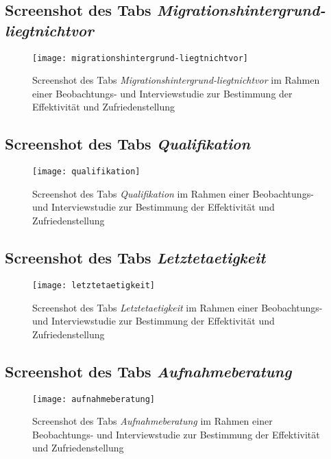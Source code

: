 \begin{landscape}
    \subsection{Screenshot des Tabs \textit{Migrationshintergrund-liegtnichtvor}}
    \label{section-migrationshintergrund-liegtnichtvor}
    \begin{figure}[H]
        \centering
        \caption{Screenshot des Tabs \textit{Migrationshintergrund-liegtnichtvor} im Rahmen einer Beobachtungs- und Interviewstudie zur Bestimmung der Effektivität und Zufriedenstellung}
        \begin{adjustbox}{width=\linewidth, center}
            \texttt{[image: migrationshintergrund-liegtnichtvor]}
        \end{adjustbox}
    \end{figure}

    \subsection{Screenshot des Tabs \textit{Qualifikation}}
    \label{section-qualifikation}
    \begin{figure}[H]
        \centering
        \caption{Screenshot des Tabs \textit{Qualifikation} im Rahmen einer Beobachtungs- und Interviewstudie zur Bestimmung der Effektivität und Zufriedenstellung}
        \begin{adjustbox}{width=\linewidth, center}
            \texttt{[image: qualifikation]}
        \end{adjustbox}
    \end{figure}

    \subsection{Screenshot des Tabs \textit{Letztetaetigkeit}}
    \label{section-letztetaetigkeit}
    \begin{figure}[H]
        \centering
        \caption{Screenshot des Tabs \textit{Letztetaetigkeit} im Rahmen einer Beobachtungs- und Interviewstudie zur Bestimmung der Effektivität und Zufriedenstellung}
        \begin{adjustbox}{width=\linewidth, center}
            \texttt{[image: letztetaetigkeit]}
        \end{adjustbox}
    \end{figure}

    \subsection{Screenshot des Tabs \textit{Aufnahmeberatung}}
    \label{section-aufnahmeberatung}
    \begin{figure}[H]
        \centering
        \caption{Screenshot des Tabs \textit{Aufnahmeberatung} im Rahmen einer Beobachtungs- und Interviewstudie zur Bestimmung der Effektivität und Zufriedenstellung}
        \begin{adjustbox}{width=\linewidth, center}
            \texttt{[image: aufnahmeberatung]}
        \end{adjustbox}
    \end{figure}


\end{landscape}
